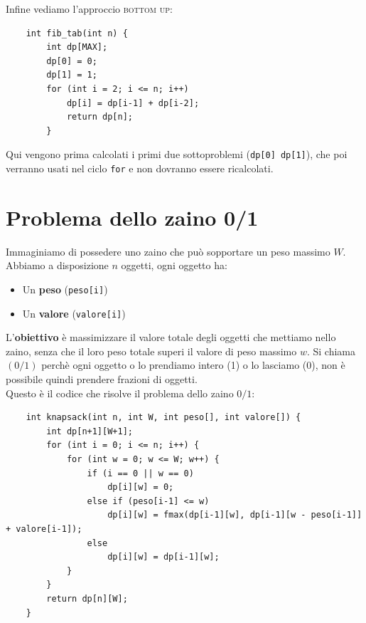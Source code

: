 \noindent Infine vediamo l'approccio \textsc{bottom up}:
\begin{verbatim}
    int fib_tab(int n) {
        int dp[MAX];
        dp[0] = 0;
        dp[1] = 1;
        for (int i = 2; i <= n; i++)
            dp[i] = dp[i-1] + dp[i-2];
            return dp[n];
        }
\end{verbatim}
Qui vengono prima calcolati i primi due sottoproblemi (\texttt{dp[0]  dp[1]}), che poi verranno usati nel ciclo \texttt{for} e non dovranno essere ricalcolati.
    
\section{Problema dello zaino 0/1}
Immaginiamo di possedere uno zaino che può sopportare un peso massimo $W$. Abbiamo a disposizione $n$ oggetti, ogni oggetto ha:
\begin{itemize}
    \item Un \textbf{peso} (\texttt{peso[i]})
    \item Un \textbf{valore} (\texttt{valore[i]}) 
\end{itemize} 
L'\textbf{obiettivo} è massimizzare il valore totale degli oggetti che mettiamo nello zaino, senza che il loro peso totale superi il valore di peso massimo $w$. 
Si chiama $(0/1)$ perchè ogni oggetto o lo prendiamo intero (1) o lo lasciamo (0), non è possibile quindi prendere frazioni di oggetti.\smallskip\\

\noindent Questo è il codice che risolve il problema dello zaino $0/1$:
\begin{verbatim}
    int knapsack(int n, int W, int peso[], int valore[]) {
        int dp[n+1][W+1];
        for (int i = 0; i <= n; i++) {
            for (int w = 0; w <= W; w++) {
                if (i == 0 || w == 0)
                    dp[i][w] = 0;
                else if (peso[i-1] <= w)
                    dp[i][w] = fmax(dp[i-1][w], dp[i-1][w - peso[i-1]] + valore[i-1]);
                else
                    dp[i][w] = dp[i-1][w];
            }
        }
        return dp[n][W];
    }
\end{verbatim}

